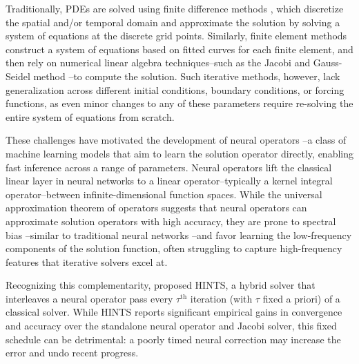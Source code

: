 \documentclass{article} %
\newcommand\ambuj[1]{\textcolor{red}{AT: #1}}
\begin{document}
Traditionally, PDEs are solved using finite difference methods \citep{smith1985numerical,leveque2007finite}, which discretize the spatial and/or temporal domain and approximate the solution by solving a system of equations at the discrete grid points. Similarly, finite element methods \citep{hughes2003finite,bathe2006finite,brenner2008mathematical} construct a system of equations based on fitted curves for each finite element, and then rely on numerical linear algebra techniques--such as the Jacobi and Gauss-Seidel method \citep{saad2003iterative}--to compute the solution. 
Such iterative methods, however, lack generalization across different initial conditions, boundary conditions, or forcing functions, as even minor changes to any of these parameters require re-solving the entire system of equations from scratch. 

These challenges have motivated the development of neural operators \citep{kovachki2023neural}--a class of machine learning models that aim to learn the solution operator directly, enabling fast inference across a range of parameters. Neural operators lift the classical linear layer in neural networks to a linear operator--typically a kernel integral operator--between infinite-dimensional function spaces. While the universal approximation theorem of operators \citep{chen1995universal} suggests that neural operators can approximate solution operators with high accuracy, they are prone to spectral bias \citep{liu2021multiscale,liu2024mitigating,you2024mscalefno,khodakarami2025mitigating,xu2025understanding}--similar to traditional neural networks \citep{rahaman2019spectral,xu2019frequency,luo2019theory}--and favor learning the low-frequency components of the solution function, often struggling to capture high-frequency features that iterative solvers excel at. 

Recognizing this complementarity, \citet{zhang2024blending} proposed HINTS, a hybrid solver that 
interleaves a neural operator pass every $\tau^{\text{th}}$ iteration (with $\tau$ fixed a priori) of a classical solver.
While HINTS reports significant empirical gains in convergence and accuracy over the standalone neural operator and Jacobi solver, this fixed schedule can be detrimental: a poorly timed neural correction may increase the error and undo recent progress. 
\end{document}
